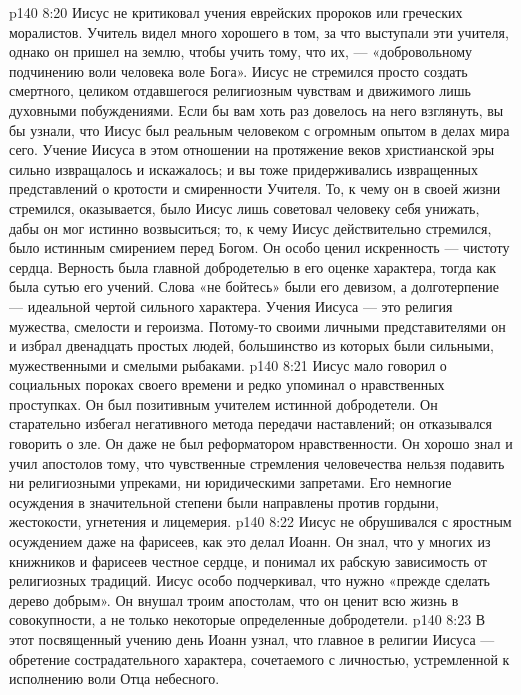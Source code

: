 \vs p140 8:20 Иисус не критиковал учения еврейских пророков или греческих моралистов. Учитель видел много хорошего в том, за что выступали эти учителя, однако он пришел на землю, чтобы учить тому, что  их, --- «добровольному подчинению воли человека воле Бога». Иисус не стремился просто создать  смертного, целиком отдавшегося религиозным чувствам и движимого лишь духовными побуждениями. Если бы вам хоть раз довелось на него взглянуть, вы бы узнали, что Иисус был реальным человеком с огромным опытом в делах мира сего. Учение Иисуса в этом отношении на протяжение веков христианской эры сильно извращалось и искажалось; и вы тоже придерживались извращенных представлений о кротости и смиренности Учителя. То, к чему он в своей жизни стремился, оказывается, было  Иисус лишь советовал человеку себя унижать, дабы он мог истинно возвыситься; то, к чему Иисус действительно стремился, было истинным смирением перед Богом. Он особо ценил искренность --- чистоту сердца. Верность была главной добродетелью в его оценке характера, тогда как  была сутью его учений. Слова «не бойтесь» были его девизом, а долготерпение --- идеальной чертой сильного характера. Учения Иисуса --- это религия мужества, смелости и героизма. Потому\hyp{}то своими личными представителями он и избрал двенадцать простых людей, большинство из которых были сильными, мужественными и смелыми рыбаками.
\vs p140 8:21 Иисус мало говорил о социальных пороках своего времени и редко упоминал о нравственных проступках. Он был позитивным учителем истинной добродетели. Он старательно избегал негативного метода передачи наставлений; он отказывался говорить о зле. Он даже не был реформатором нравственности. Он хорошо знал и учил апостолов тому, что чувственные стремления человечества нельзя подавить ни религиозными упреками, ни юридическими запретами. Его немногие осуждения в значительной степени были направлены против гордыни, жестокости, угнетения и лицемерия.
\vs p140 8:22 Иисус не обрушивался с яростным осуждением даже на фарисеев, как это делал Иоанн. Он знал, что у многих из книжников и фарисеев честное сердце, и понимал их рабскую зависимость от религиозных традиций. Иисус особо подчеркивал, что нужно «прежде сделать дерево добрым». Он внушал троим апостолам, что он ценит всю жизнь в совокупности, а не только некоторые определенные добродетели.
\vs p140 8:23 \pc В этот посвященный учению день Иоанн узнал, что главное в религии Иисуса --- обретение сострадательного характера, сочетаемого с личностью, устремленной к исполнению воли Отца небесного.

